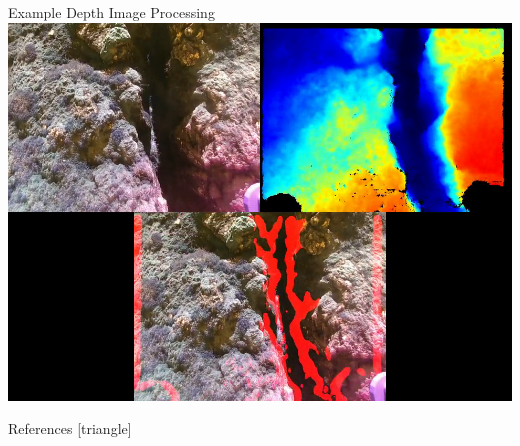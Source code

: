 \documentclass[aspectratio=169]{beamer}
\begin{document}
\begin{frame}{Example Depth Image Processing}
	\centering
	\includegraphics[height=\textheight]{./images/depth_processing_screenshot}
\end{frame}

\begin{frame}{References}
	[triangle]
	
	
\end{frame}
\end{document}
